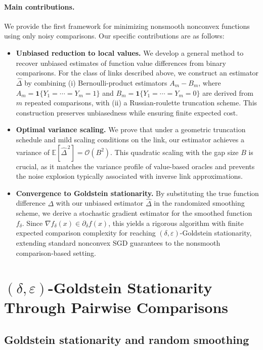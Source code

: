 \documentclass[11pt]{article}
\theoremstyle{plain}
\theoremstyle{remark}
\newcommand{\E}{\mathbb{E}}
\newcommand{\1}{\mathbf{1}}
\begin{document}
\paragraph{Main contributions.}
We provide the first framework for minimizing nonsmooth nonconvex functions using only noisy comparisons. Our specific contributions are as follows:

\begin{itemize}[noitemsep,topsep=0pt]
    \item \textbf{Unbiased reduction to local values.} We develop a general method to recover unbiased estimates of function value differences from binary comparisons. For the class of links described above, we construct an estimator $\widehat\Delta$ by combining (i) Bernoulli-product estimators $A_m-B_m$, where $A_m=\1\{Y_1=\cdots=Y_m=1\}$ and $B_m=\1\{Y_1=\cdots=Y_m=0\}$ are derived from $m$ repeated comparisons, with (ii) a Russian-roulette truncation scheme. This construction preserves unbiasedness while ensuring finite expected cost.

    \item \textbf{Optimal variance scaling.} We prove that under a geometric truncation schedule and mild scaling conditions on the link, our estimator achieves a variance of $\E[\widehat\Delta^{\,2}]=\mathcal{O}(B^2)$. This quadratic scaling with the gap size $B$ is crucial, as it matches the variance profile of value-based oracles and prevents the noise explosion typically associated with inverse link approximations.

    \item \textbf{Convergence to Goldstein stationarity.} By substituting the true function difference $\Delta$ with our unbiased estimator $\widehat\Delta$ in the randomized smoothing scheme, we derive a stochastic gradient estimator for the smoothed function $f_\delta$. Since $\nabla f_\delta(x)\in\partial_\delta f(x)$, this yields a rigorous algorithm with finite expected comparison complexity for reaching $(\delta,\varepsilon)$-Goldstein stationarity, extending standard nonconvex SGD guarantees to the nonsmooth comparison-based setting.
\end{itemize}


\section{$(\delta,\varepsilon)$-Goldstein Stationarity Through Pairwise Comparisons}

\subsection{Goldstein stationarity and random smoothing}
\label{sec:goldstein_smoothing}
\end{document}
